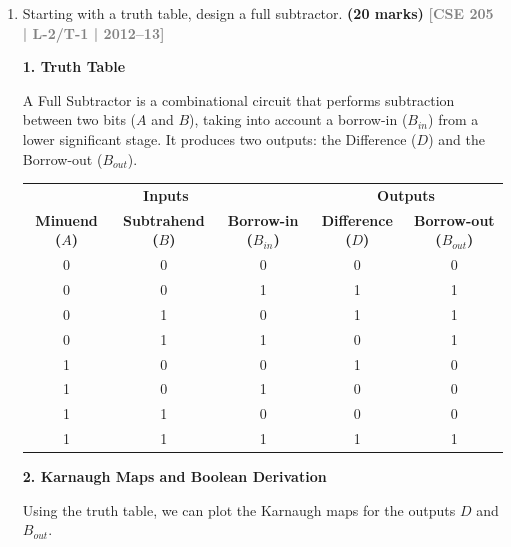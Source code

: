 \documentclass[12pt,a3paper]{article}
\newcommand{\yr}[1]{\hfill\textcolor{gray}{\small\textbf{[#1]}}}
\newcommand{\mk}[1]{\textcolor{orange!70!black}{\small\textbf{(#1 marks)}}}
\begin{document}
\begin{enumerate}
\begin{tcolorbox}[enhanced,breakable,ansbox,colback=cD!4,colframe=cD,boxrule=0.8pt,arc=5pt,title={\textbf{Answer}},fonttitle=\bfseries\color{white},colbacktitle=cD]
\begin{center}
\begin{circuitikz}[line width=0.8pt]
\end{circuitikz}
\end{center}

\end{tcolorbox}

\item Starting with a truth table, design a full subtractor.
\mk{20} \yr{CSE 205 | L-2/T-1 | 2012--13}

\begin{tcolorbox}[enhanced,breakable,ansbox,colback=cD!4,colframe=cD,boxrule=0.8pt,arc=5pt,title={\textbf{Answer}},fonttitle=\bfseries\color{white},colbacktitle=cD]

\textbf{\textcolor{cD}{1. Truth Table}}

A Full Subtractor is a combinational circuit that performs subtraction between two bits ($A$ and $B$), taking into account a borrow-in ($B_{in}$) from a lower significant stage. It produces two outputs: the Difference ($D$) and the Borrow-out ($B_{out}$).

\begin{center}
\renewcommand{\arraystretch}{1.2}
\begin{tabular}{@{}ccc|cc@{}}
\toprule
\multicolumn{3}{c|}{\textbf{Inputs}} & \multicolumn{2}{c}{\textbf{Outputs}} \\
\textbf{Minuend ($A$)} & \textbf{Subtrahend ($B$)} & \textbf{Borrow-in ($B_{in}$)} & \textbf{Difference ($D$)} & \textbf{Borrow-out ($B_{out}$)} \\ \midrule
0 & 0 & 0 & 0 & 0 \\
0 & 0 & 1 & 1 & 1 \\
0 & 1 & 0 & 1 & 1 \\
0 & 1 & 1 & 0 & 1 \\
1 & 0 & 0 & 1 & 0 \\
1 & 0 & 1 & 0 & 0 \\
1 & 1 & 0 & 0 & 0 \\
1 & 1 & 1 & 1 & 1 \\ \bottomrule
\end{tabular}
\end{center}

\vspace{1em}
\textbf{\textcolor{cD}{2. Karnaugh Maps and Boolean Derivation}}

Using the truth table, we can plot the Karnaugh maps for the outputs $D$ and $B_{out}$.


\end{tcolorbox}
\end{enumerate}
\end{document}
